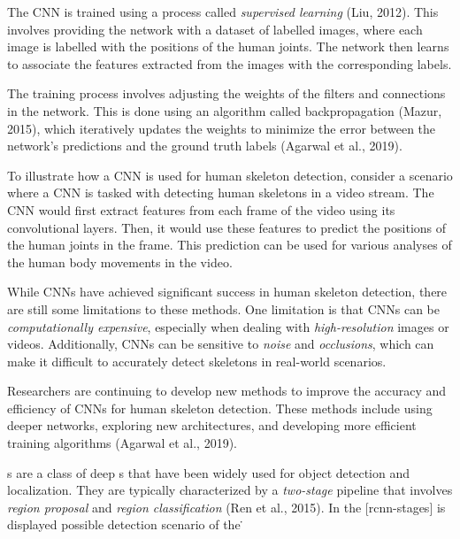 
The CNN is trained using a process called {\em supervised learning} (\scc Liu, 2012). This involves providing the network with a dataset of labelled images, where each image is labelled with the positions of the human joints. The network then learns to associate the features extracted from the images with the corresponding labels.

The training process involves adjusting the weights of the filters and connections in the network. This is done using an algorithm called backpropagation (\scc Mazur, 2015), which iteratively updates the weights to minimize the error between the network's predictions and the ground truth labels (\scc Agarwal et al., 2019).


To illustrate how a CNN is used for human skeleton detection, consider a scenario where a CNN is tasked with detecting human skeletons in a video stream. The CNN would first extract features from each frame of the video using its convolutional layers. Then, it would use these features to predict the positions of the human joints in the frame. This prediction can be used for various analyses of the human body movements in the video.


While CNNs have achieved significant success in human skeleton detection, there are still some limitations to these methods. One limitation is that CNNs can be {\em computationally expensive}, especially when dealing with {\em high-resolution} images or videos. Additionally, CNNs can be sensitive to {\em noise} and {\em occlusions}, which can make it difficult to accurately detect skeletons in real-world scenarios.

Researchers are continuing to develop new methods to improve the accuracy and efficiency of CNNs for human skeleton detection. These methods include using deeper networks, exploring new architectures, and developing more efficient training algorithms (\scc Agarwal et al., 2019).

\RCNN\-s are a class of deep \CNN\-s that have been widely used for object detection and localization. They are typically characterized by a {\em two-stage} pipeline that involves {\em region proposal} and {\em region classification} (\scc Ren et al., 2015). In the [rcnn-stages] is displayed possible detection scenario of the \RCNN\.

